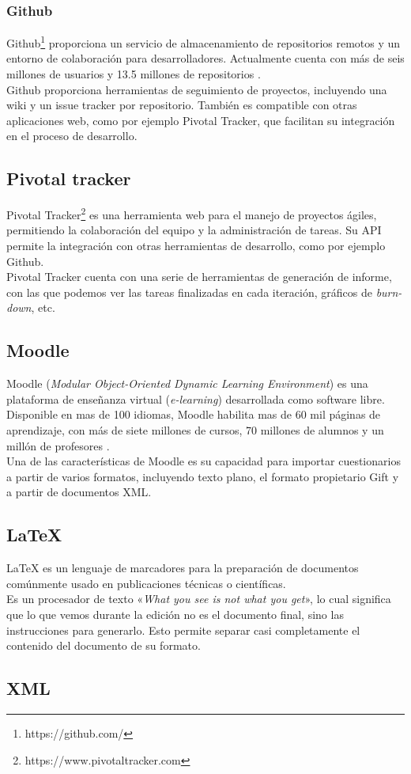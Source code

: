 \subsubsection{Github}

Github\footnote{https://github.com/} proporciona un servicio de almacenamiento de repositorios remotos y un entorno de colaboración para desarrolladores.
Actualmente cuenta con más de seis millones de usuarios y 13.5 millones de repositorios \cite{website:github}.
\\
Github proporciona herramientas de seguimiento de proyectos, incluyendo una wiki y un issue tracker por repositorio.
También es compatible con otras aplicaciones web, como por ejemplo Pivotal Tracker, que facilitan su integración en el proceso de desarrollo.

\subsection{Pivotal tracker}

Pivotal Tracker\footnote{https://www.pivotaltracker.com} es una herramienta web para el manejo de proyectos ágiles, permitiendo la colaboración del equipo y la administración de tareas.
Su API permite la integración con otras herramientas de desarrollo, como por ejemplo Github.
\\
Pivotal Tracker cuenta con una serie de herramientas de generación de informe, con las que podemos ver las tareas finalizadas en cada iteración, gráficos de \emph{burn-down}, etc.

\subsection{Moodle}

Moodle (\emph{Modular Object-Oriented Dynamic Learning Environment}) es una plataforma de enseñanza virtual (\emph{e-learning}) desarrollada como software libre.
Disponible en mas de 100 idiomas, Moodle habilita mas de 60 mil páginas de aprendizaje, con más de siete millones de cursos, 70 millones de alumnos y un millón de profesores \cite{website:moodle}.
\\
Una de las características de Moodle es su capacidad para importar cuestionarios a partir de varios formatos, incluyendo texto plano, el formato propietario Gift y a partir de documentos XML.

\subsection{LaTeX}

\LaTeX{} es un lenguaje de marcadores para la preparación de documentos comúnmente usado en publicaciones técnicas o científicas.
\\
Es un procesador de texto «\emph{What you see is not what you get}», lo cual significa que lo que vemos durante la edición no es el 
documento final, sino las instrucciones para generarlo.
Esto permite separar casi completamente el contenido del documento de su formato.

\subsection{XML}

